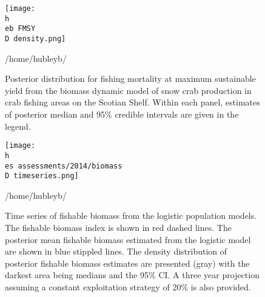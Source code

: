 \documentclass[11pt]{article}
\newcommand{\D}{.}
\newcommand{\h}{/home/hubleyb/}
\newcommand{\es}{bio.data/bio.snowcrab/}
\newcommand{\eb}{bio.data/bio.snowcrab/assessments/2016/figures/bugs/survey/}
\begin{document}
\begin{figure}
    
    \texttt{[image: \\h \\eb FMSY\\D density.png]}
    \caption{Posterior distribution for fishing mortality at maximum sustainable yield from the biomass dynamic model of snow crab production in crab fishing areas on the Scotian Shelf. Within each panel, estimates of posterior median and 95\% credible intervals are given in the legend.}
  
\h \end{figure}
\clearpage



\begin{figure}
\centering
\texttt{[image: \\h \\es assessments/2014/biomass\\D timeseries.png]}\\ 
\caption{Time series of fishable biomass from the logistic population models. The fishable biomass index is shown in red dashed lines. The posterior mean fishable biomass estimated from the logistic model are shown in blue stippled lines. The density distribution of posterior fishable biomass estimates are presented (gray) with the darkest area being medians and the 95\% CI. A three year projection assuming a constant exploitation strategy of 20\% is also provided.}
\h \end{figure}
\clearpage
%
%
%
%
%
%
\end{document}
